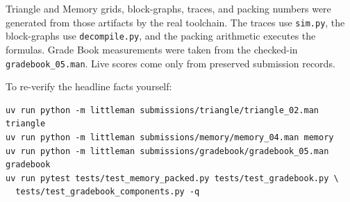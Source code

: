 \documentclass[11pt,a4paper]{article}
\begin{document}
Triangle and Memory grids, block-graphs, traces, and packing numbers were
generated from those artifacts by the real toolchain. The traces use
\texttt{sim.py}, the block-graphs use \texttt{decompile.py}, and the packing
arithmetic executes the formulas. Grade Book measurements were taken from
the checked-in \texttt{gradebook\_05.man}. Live scores come only from
preserved submission records.

To re-verify the headline facts yourself:

\begin{verbatim}
uv run python -m littleman submissions/triangle/triangle_02.man triangle
uv run python -m littleman submissions/memory/memory_04.man memory
uv run python -m littleman submissions/gradebook/gradebook_05.man gradebook
uv run pytest tests/test_memory_packed.py tests/test_gradebook.py \
  tests/test_gradebook_components.py -q
\end{verbatim}
\end{document}
